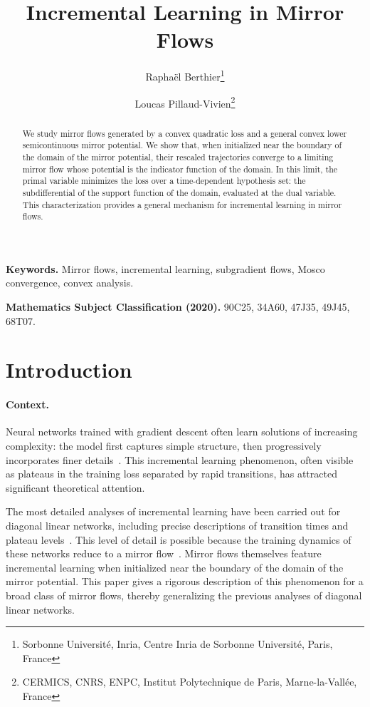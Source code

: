 \documentclass[11pt,english,reqno]{article}
\author{Rapha\"el Berthier\thanks{Sorbonne Universit\'e, Inria, Centre Inria de Sorbonne Universit\'e, Paris, France} \and Loucas Pillaud-Vivien\thanks{CERMICS, CNRS, ENPC, Institut Polytechnique de Paris, Marne-la-Vallée, France}}
\theoremstyle{plain}
\theoremstyle{definition}
\theoremstyle{remark}
\numberwithin{equation}{section}
\begin{document}
\title{Incremental Learning in Mirror Flows}

\maketitle

\begin{abstract}
	We study mirror flows generated by a convex quadratic loss and a general convex lower semicontinuous mirror potential. We show that, when initialized near the boundary of the domain of the mirror potential, their rescaled trajectories converge to a limiting mirror flow whose potential is the indicator function of the domain. In this limit, the primal variable minimizes the loss over a time-dependent hypothesis set: the subdifferential of the support function of the domain, evaluated at the dual variable. This characterization provides a general mechanism for incremental learning in mirror flows.
\end{abstract}

\medskip

\noindent\textbf{Keywords.} Mirror flows, incremental learning, subgradient flows, Mosco convergence, convex analysis.

\smallskip

\noindent\textbf{Mathematics Subject Classification (2020).} 90C25, 34A60, 47J35, 49J45, 68T07.


\setcounter{tocdepth}{2}
\tableofcontents
\newpage

\section{Introduction}
%

\paragraph*{Context.} 

Neural networks trained with gradient descent often learn solutions of increasing complexity: the model first captures simple structure, then progressively incorporates finer details~\cite{arpit2017closer,kalimeris2019sgd,zhang2025saddle}. This incremental learning phenomenon, often visible as plateaus in the training loss separated by rapid transitions, has attracted significant theoretical attention.

The most detailed analyses of incremental learning have been carried out for diagonal linear networks, including precise descriptions of transition times and plateau levels~\cite{berthier2023incremental,pesme2023saddle}. This level of detail is possible because the training dynamics of these networks reduce to a mirror flow~\cite{woodworth2020kernel}. Mirror flows themselves feature incremental learning when initialized near the boundary of the domain of the mirror potential. This paper gives a rigorous description of this phenomenon for a broad class of mirror flows, thereby generalizing the previous analyses of diagonal linear networks.
\end{document}
